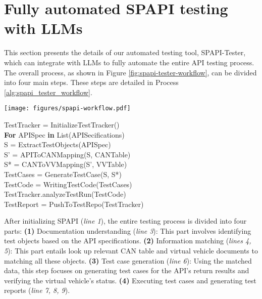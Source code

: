 \section{Fully automated SPAPI testing with LLMs}
This section presents the details of our automated testing tool, SPAPI-Tester, which can integrate with LLMs to fully automate the entire API testing process.
The overall process, as shown in Figure \ref{fig:spapi-tester-workflow}, can be divided into four main steps. These steps are detailed in Process \ref{alg:spapi_tester_workflow}.

\begin{figure*}[ht!]
    \centering
    \texttt{[image: figures/spapi-workflow.pdf]}
    \caption{Architecture and workflow of SPAPI-Tester: The pipeline largely preserves the manual process and selectively uses LLMs to automate discrete steps.}
    \vspace{-5mm}
    \label{fig:spapi-tester-workflow}
\end{figure*}

\begin{algorithm}[htbp]
    \caption{Overall Workflow of SPAPI-Tester} \label{alg:spapi_tester_workflow}
    TestTracker = InitializeTestTracker() \\
    \textbf{For} APISpec \textbf{in} List(APISecifications) \\
    \hspace*{2em} S = ExtractTestObjects(APISpec) \\
    \hspace*{2em} S' = APIToCANMapping(S, CANTable) \\
    \hspace*{2em} S* = CANToVVMapping(S', VVTable) \\
    \hspace*{2em} TestCases = GenerateTestCase(S, S*) \\
    \hspace*{2em} TestCode = WritingTestCode(TestCases) \\    
    \hspace*{2em} TestTracker.analyzeTestRun(TestCode) \\
TestReport = PushToTestRepo(TestTracker)
\end{algorithm}

After initializing SPAPI (\textit{line 1}), the entire testing process is divided into four parts:
\textbf{(1)} Documentation understanding (\textit{line 3}): This part involves identifying test objects based on the API specifications. 
\textbf{(2)} Information matching (\textit{lines 4, 5}): This part entails look up relevant CAN table and virtual vehicle documents to matching all these objects. 
\textbf{(3)} Test case generation (\textit{line 6}): Using the matched data, this step focuses on generating test cases for the API's return results and verifying the virtual vehicle's status.
\textbf{(4)} Executing test cases and generating test reports (\textit{line 7, 8, 9}).


